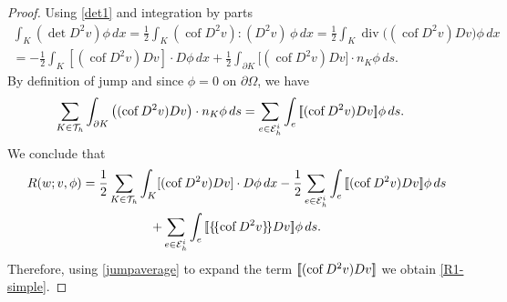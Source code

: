 \documentclass[12pt]{amsart}
\def \[{ \mbox{[ \hspace{-.5em}[}} %
\def \]{ \mbox{] \hspace{-.5em}]}}
\numberwithin{equation}{section}
\newcommand{\ud}{\,d}
\newcommand\cof{\operatorname{cof}}
\renewcommand{\div}{\operatorname{div}}
\begin{document}
\begin{proof}

Using \eqref{det1} and integration by parts
\begin{multline*}
 \int_{K} (\det D^2 v ) \phi \ud x = \frac{1}{2}  \int_{K} (\cof D^2 v ): (D^2 v) \, \phi \ud x = \frac{1}{2}  \int_{K} \div\big((\cof D^2 v) D v ) \phi \ud x
 \\
 =-  \frac{1}{2} \int_K [(\cof D^2 v) D v ] \cdot D \phi \ud x + \frac{1}{2}  \int_{\partial K} \big[ (\cof D^2 v) D v \big] \cdot n_K \phi \ud s.
\end{multline*}
By definition of jump and since $\phi=0$ on $\partial \Omega$, we have
\begin{align}
\sum_{K \in \mathcal{T}_h} \int_{\partial K} \big( (\cof D^2 v) D v \big) \cdot n_K \phi \ud s & = \sum_{e \in \mathcal{E}_h^i } \int_e \[(\cof D^2 v) D v \] \phi \ud s  \label{part-22}.
\end{align}
We conclude that
\begin{multline*}
R(w;v,\phi) = \frac{1}{2} \sum_{K \in \mathcal{T}_h}  \int_K [(\cof D^2 v) D v ] \cdot D \phi \ud x 
-\frac{1}{2}  \sum_{e \in \mathcal{E}_h^i } \int_e \[(\cof D^2 v) D v \] \phi \ud s \\
+ \sum_{e \in \mathcal{E}_h^i } \int_e \[\{\!\{\cof D^2 v \}\!\} D v \] \phi\ud s.
\end{multline*}
Therefore, using \eqref{jumpaverage} to expand the term $\[(\cof D^2 v) D v \] $ we obtain \eqref{R1-simple}.


\end{proof}
\end{document}

